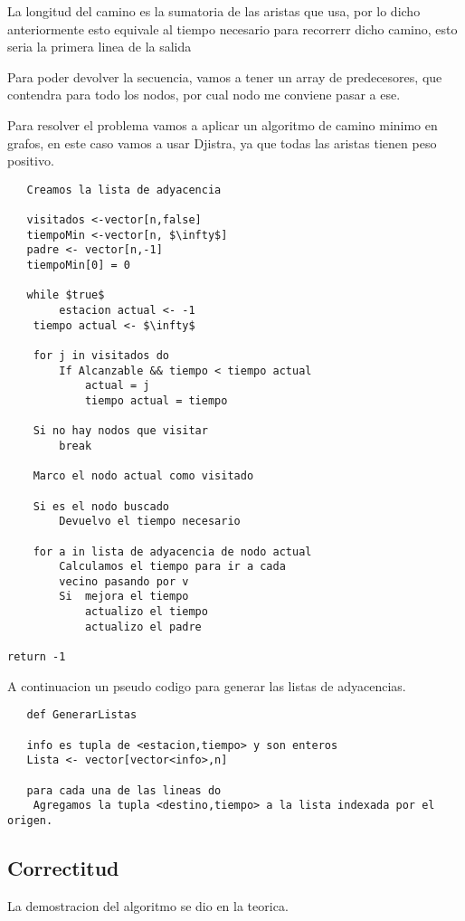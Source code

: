 La longitud del camino es la sumatoria de las aristas que usa, por lo dicho anteriormente esto equivale al tiempo necesario para recorrerr dicho camino, esto seria la primera linea de la salida

Para poder devolver la secuencia, vamos a tener un array de predecesores, que contendra para todo los nodos, por cual nodo me conviene pasar a ese.

Para resolver el problema vamos a aplicar un algoritmo de camino minimo en grafos, en este caso vamos a usar Djistra, ya que todas las aristas tienen peso positivo. 

   \begin{lstlisting}
   Creamos la lista de adyacencia

   visitados <-vector[n,false]
   tiempoMin <-vector[n, $\infty$]
   padre <- vector[n,-1]
   tiempoMin[0] = 0
   
   while $true$
      	estacion actual <- -1
   	tiempo actual <- $\infty$

   	for j in visitados do
   		If Alcanzable && tiempo < tiempo actual
   			actual = j
   			tiempo actual = tiempo

   	Si no hay nodos que visitar
   		break

   	Marco el nodo actual como visitado

   	Si es el nodo buscado
   		Devuelvo el tiempo necesario

   	for a in lista de adyacencia de nodo actual
   		Calculamos el tiempo para ir a cada 
   		vecino pasando por v
   		Si  mejora el tiempo
   			actualizo el tiempo 
   			actualizo el padre		

return -1
   \end{lstlisting}

   A continuacion un pseudo codigo para generar las listas de adyacencias.
   \begin{lstlisting}
   def GenerarListas

   info es tupla de <estacion,tiempo> y son enteros 
   Lista <- vector[vector<info>,n]

   para cada una de las lineas do
   	Agregamos la tupla <destino,tiempo> a la lista indexada por el origen.

   \end{lstlisting}

\subsection{Correctitud}
La demostracion del algoritmo se dio en la teorica.
